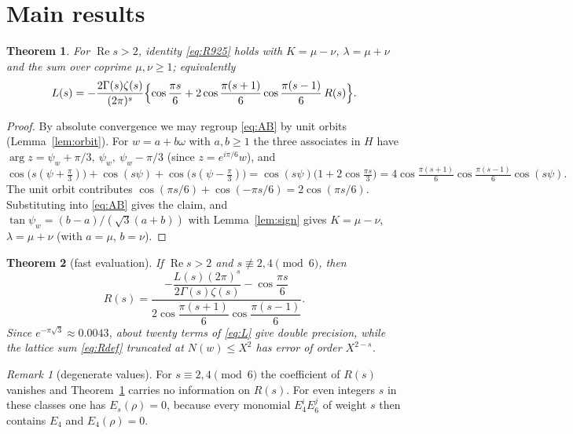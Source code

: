 \documentclass[11pt]{article}
\newtheorem{theorem}{Theorem}
\theoremstyle{remark}
\newtheorem{remark}{Remark}
\begin{document}
\section{Main results}
\begin{theorem}\label{thm:main}
For $\operatorname{Re}s>2$, identity \eqref{eq:R925} holds with $K=\mu-\nu$, $\lambda=\mu+\nu$ and the sum over coprime $\mu,\nu\ge1$;
equivalently
\[
L(s)=-\frac{2\Gamma(s)\zeta(s)}{(2\pi)^s}\Bigl\{\cos\frac{\pi s}{6}+2\cos\frac{\pi(s+1)}{6}\cos\frac{\pi(s-1)}{6}\,R(s)\Bigr\}.
\]
\end{theorem}
\begin{proof}
By absolute convergence we may regroup \eqref{eq:AB} by unit orbits (Lemma~\ref{lem:orbit}). For $w=a+b\omega$ with $a,b\ge1$ the three
associates in $H$ have $\arg z=\psi_w+\pi/3,\ \psi_w,\ \psi_w-\pi/3$ (since $z=e^{i\pi/6}w$), and
\[
\cos\bigl(s(\psi+\tfrac{\pi}{3})\bigr)+\cos(s\psi)+\cos\bigl(s(\psi-\tfrac{\pi}{3})\bigr)=\cos(s\psi)\bigl(1+2\cos\tfrac{\pi s}{3}\bigr)
=4\cos\tfrac{\pi(s+1)}{6}\cos\tfrac{\pi(s-1)}{6}\cos(s\psi).
\]
The unit orbit contributes $\cos(\pi s/6)+\cos(-\pi s/6)=2\cos(\pi s/6)$. Substituting into \eqref{eq:AB} gives the claim, and
$\tan\psi_w=(b-a)/(\sqrt3(a+b))$ with Lemma~\ref{lem:sign} gives $K=\mu-\nu$, $\lambda=\mu+\nu$ (with $a=\mu$, $b=\nu$).
\end{proof}

\begin{theorem}[fast evaluation]\label{thm:fast}
If $\operatorname{Re}s>2$ and $s\not\equiv2,4\pmod 6$, then
\[
R(s)=\frac{-\dfrac{L(s)(2\pi)^s}{2\Gamma(s)\zeta(s)}-\cos\dfrac{\pi s}{6}}{2\cos\dfrac{\pi(s+1)}{6}\cos\dfrac{\pi(s-1)}{6}}.
\]
Since $e^{-\pi\sqrt3}\approx0.0043$, about twenty terms of \eqref{eq:L} give double precision, while the lattice sum \eqref{eq:Rdef}
truncated at $N(w)\le X^2$ has error of order $X^{2-s}$.
\end{theorem}
\begin{remark}[degenerate values]
For $s\equiv2,4\pmod6$ the coefficient of $R(s)$ vanishes and Theorem~\ref{thm:main} carries no information on $R(s)$. For even
integers $s$ in these classes one has $E_s(\rho)=0$, because every monomial $E_4^iE_6^j$ of weight $s$ then contains $E_4$ and $E_4(\rho)=0$.
\end{remark}
\end{document}
